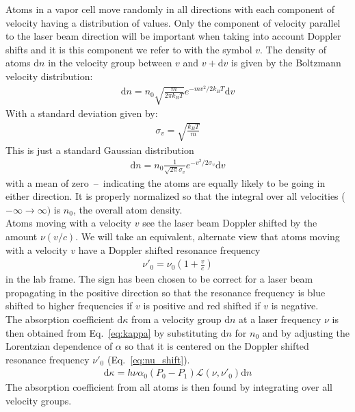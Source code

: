 Atoms in a vapor cell move randomly in all directions with each component of velocity having a distribution
of values. Only the component of velocity parallel to the laser beam direction will be important when taking
into account Doppler shifts and it is this component we refer to with the symbol \(v \). The density of atoms
\(\mathrm{d}n \) in the velocity group between \(v \) and \(v+\mathrm{d}v \) is given by the Boltzmann velocity
distribution:
\begin{align}
    \mathrm{d}n = n_0\sqrt{ \frac{m}{2\pi k_B T} } e^{-mv^2 / 2 k_B T} \mathrm{d}v
\end{align}
With a standard deviation given by:
\begin{align}
    \sigma_v = \sqrt{\frac{k_B T}{m}}
\end{align}
This is just a standard Gaussian distribution
\begin{align}
    \mathrm{d}n = n_0 \frac{1}{\sqrt{2\pi}\sigma_v}  e^{-v^2 / 2\sigma_v} \mathrm{d}v
\end{align}
with a mean of zero~--~indicating the atoms are equally likely to be going in either direction. It is properly
normalized so that the integral over all velocities (\(-\infty \rightarrow \infty) \) is \(n_0 \), the overall
atom density. \\
Atoms moving with a velocity \(v \) see the laser beam Doppler shifted by the amount \(\nu(v/c) \). We will
take an equivalent, alternate view that atoms moving with a velocity \(v \) have a Doppler shifted resonance
frequency
\begin{align}\label{eq:nu_shift}
    \nu'_0 = \nu_0 \left ( 1 + \frac{v}{c} \right)
\end{align}
in the lab frame. The sign has been chosen to be correct for a laser beam propagating in the positive direction
so that the resonance frequency is blue shifted to higher frequencies if \(v \) is positive and red shifted if
\(v \) is negative.\\
The absorption coefficient \(\mathrm{d}\kappa \) from a velocity group \(\mathrm{d}n \) at a laser frequency 
\(\nu \) is then obtained from Eq.~\ref{eq:kappa} by substituting \(\mathrm{d}n \) for \(n_0 \) and by adjusting
the Lorentzian dependence of \(\alpha \) so that it is centered on the Doppler shifted resonance frequency
\(\nu'_0 \) (Eq.~\ref{eq:nu_shift}).
\begin{align}
    \mathrm{d}\kappa = h\nu \alpha_0(P_0-P_1) \mathcal{L}(\nu,\nu'_0) \mathrm{d}n
\end{align}
The absorption coefficient from all atoms is then found by integrating over all velocity groups.

